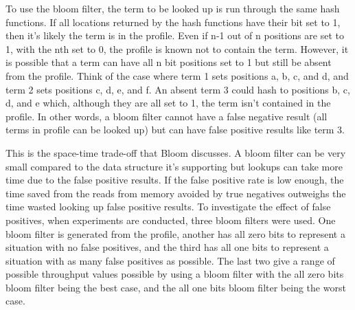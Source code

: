 
To use the bloom filter, the term to be looked up is run through the same hash
functions. If all locations returned by the hash functions have their bit set to
1, then it's likely the term is in the profile. Even if n-1 out of n positions
are set to 1, with the nth set to 0, the profile is known not to contain the
term. However, it is possible that a term can have all n bit positions set to 1
but still be absent from the profile. Think of the case where term 1 sets
positions a, b, c, and d, and term 2 sets positions c, d, e, and f. An absent
term 3 could hash to positions b, c, d, and e which, although they are all set
to 1, the term isn't contained in the profile. In other words, a bloom filter
cannot have a false negative result (all terms in profile can be looked up) but
can have false positive results like term 3.

This is the space-time trade-off that Bloom discusses. A bloom filter can be
very small compared to the data structure it's supporting but lookups can take
more time due to the false positive results. If the false positive rate is low
enough, the time saved from the reads from memory avoided by true negatives
outweighs the time wasted looking up false positive results. To investigate the
effect of false positives, when experiments are conducted, three bloom filters
were used. One bloom filter is generated from the profile, another has all zero
bits to represent a situation with no false positives, and the third has all one
bits to represent a situation with as many false positives as possible. The last
two give a range of possible throughput values possible by using a bloom filter
with the all zero bits bloom filter being the best case, and the all one bits
bloom filter being the worst case.
